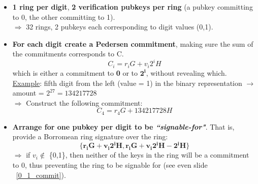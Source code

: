 \documentclass[10.5pt,compress]{beamer}
\begin{document}
\begin{frame}[allowframebreaks]
\begin{enumerate}
\begin{enumerate}
            \begin{itemize}
                \item \textbf{1 ring per digit}, \textbf{2 verification pubkeys per ring} (a pubkey committing to 0, the other committing to 1).\\
                $\Rightarrow$ 32 rings, 2 pubkeys each corresponding to digit values (0,1).
                \item \textbf{For each digit create a Pedersen commitment}, making sure the sum of the commitments corresponds to C. 
                \begin{equation*}
                    C_i = r_iG + v_i2^iH
                \end{equation*}
                which is either a commitment to \textbf{0} or to $\boldsymbol{2^i}$, without revealing which.\\
                \underline{Example}: fifth digit from the left (value = 1) in the binary representation $\rightarrow$ amount = $2^{27} = 134217728$\\
                $\Rightarrow$ Construct the following commitment:
                \begin{equation*}
                    C_4 = r_4G + 134217728H
                \end{equation*}
                \framebreak
                \item \textbf{Arrange for one pubkey per digit to be \textit{``signable-for"}}.
                That is, provide a Borromean ring signature over the ring:\\
                \begin{equation*}
                    \{\boldsymbol{r_iG + v_i2^iH}, \boldsymbol{r_iG + v_i2^iH - 2^iH}\}
                \end{equation*}
                $\Rightarrow$ if $v_i \notin$ \{0,1\}, then neither of the keys in the ring will be a commitment to 0, thus preventing the ring to be signable for (see even slide ~\ref{0_1_commit}).\\

\end{itemize}
\end{enumerate}
\end{enumerate}
\end{frame}
\end{document}
